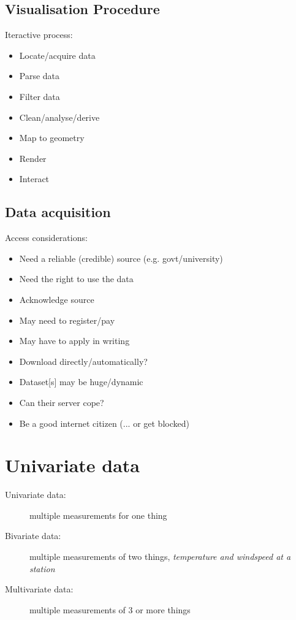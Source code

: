 \subsection{Visualisation Procedure}
Iteractive process:
\begin{itemize}
	\item Locate/acquire data
	\item Parse data
	\item Filter data
	\item Clean/analyse/derive
	\item Map to geometry
	\item Render
	\item Interact	
\end{itemize}

\subsection{Data acquisition}
Access considerations:
\begin{itemize}
	\item Need a reliable (credible) source (e.g. govt/university)
	\item Need the right to use the data
	\item Acknowledge source
	\item May need to register/pay
	\item May have to apply in writing
	\item Download directly/automatically?
	\item Dataset[s] may be huge/dynamic
	\item Can their server cope?
	\item Be a good internet citizen (... or get blocked)	
\end{itemize}

\section{Univariate data}
\begin{description}
	\item[Univariate data:] multiple measurements for one thing
	\item[Bivariate data:] multiple measurements of two things, \textit{temperature and windspeed at a station}
	\item[Multivariate data:] multiple measurements of 3 or more things
\end{description}


